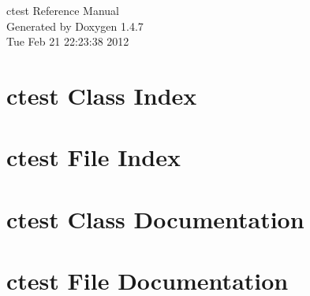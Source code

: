 \documentclass[a4paper]{book}
\begin{document}
\begin{titlepage}
\vspace*{7cm}
\begin{center}
{\Large ctest Reference Manual}\\
\vspace*{1cm}
{\large Generated by Doxygen 1.4.7}\\
\vspace*{0.5cm}
{\small Tue Feb 21 22:23:38 2012}\\
\end{center}
\end{titlepage}
\clearemptydoublepage
{}
\tableofcontents
\clearemptydoublepage
{}
\chapter{ctest Class Index}

\chapter{ctest File Index}

\chapter{ctest Class Documentation}




\chapter{ctest File Documentation}










\printindex
\end{document}
